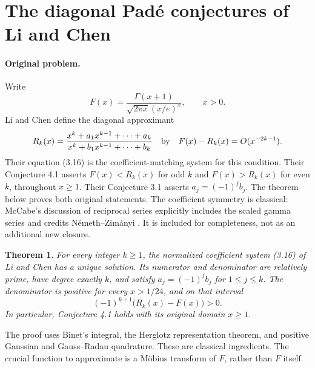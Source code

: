 \documentclass[11pt,a4paper]{article}
\newtheorem{theorem}{Theorem}[section]
\theoremstyle{definition}
\theoremstyle{remark}
\numberwithin{equation}{section}
\begin{document}
\section{The diagonal Pad\'e conjectures of Li and Chen}
\label{sec:li-chen-pade}

\paragraph{Original problem.}
Write
\[
 F(x)=\frac{\Gamma(x+1)}{\sqrt{2\pi x}(x/e)^x},\qquad x>0.
\]
Li and Chen \cite{LiChen2017} define the diagonal approximant
\[
 R_k(x)=\frac{x^k+a_1x^{k-1}+\cdots+a_k}
                   {x^k+b_1x^{k-1}+\cdots+b_k}
 \quad\hbox{by}\quad F(x)-R_k(x)=O(x^{-2k-1}).
\]
Their equation (3.16) is the coefficient-matching system for this
condition. Their Conjecture 4.1 asserts $F(x)<R_k(x)$ for odd $k$
and $F(x)>R_k(x)$ for even $k$, throughout $x\ge1$.
Their Conjecture 3.1 asserts $a_j=(-1)^jb_j$.
The theorem below proves both original statements. The coefficient
symmetry is classical: McCabe's discussion of reciprocal series
\cite[pp.~67--68]{McCabe1989} explicitly includes the scaled gamma
series and credits N\'emeth--Zim\'anyi \cite{NemethZimanyi1982}.
It is included for completeness, not as an additional new closure.

\begin{theorem}\label{lc:main}
For every integer $k\ge1$, the normalized coefficient system (3.16)
of Li and Chen has a unique solution. Its numerator and denominator
are relatively prime, have degree exactly $k$, and satisfy
$a_j=(-1)^jb_j$ for $1\le j\le k$.
The denominator is positive for every $x>1/24$, and on that interval
\[
 (-1)^{k+1}\bigl(R_k(x)-F(x)\bigr)>0.
\]
In particular, Conjecture 4.1 holds with its original domain $x\ge1$.
\end{theorem}

The proof uses Binet's integral, the Herglotz representation theorem,
and positive Gaussian and Gauss--Radau quadrature. These are classical
ingredients. The crucial function to approximate is a M\"obius
transform of $F$, rather than $F$ itself.
\end{document}
